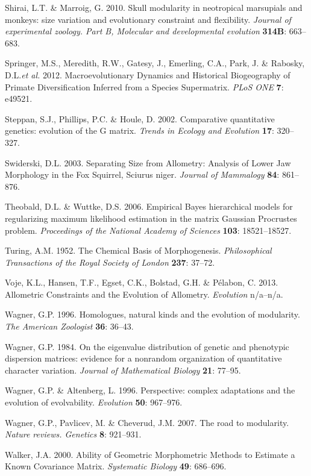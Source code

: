 \documentclass[11pt,twoside]{report}
\begin{document}
Shirai, L.T. \& Marroig, G. 2010. Skull modularity in neotropical
marsupials and monkeys: size variation and evolutionary constraint and
flexibility. \emph{Journal of experimental zoology. Part B, Molecular
and developmental evolution} \textbf{314B}: 663--683.

Springer, M.S., Meredith, R.W., Gatesy, J., Emerling, C.A., Park, J. \&
Rabosky, D.L.\emph{et al.} 2012. Macroevolutionary Dynamics and
Historical Biogeography of Primate Diversification Inferred from a
Species Supermatrix. \emph{PLoS ONE} \textbf{7}: e49521.

Steppan, S.J., Phillips, P.C. \& Houle, D. 2002. Comparative
quantitative genetics: evolution of the G matrix. \emph{Trends in
Ecology and Evolution} \textbf{17}: 320--327.

Swiderski, D.L. 2003. Separating Size from Allometry: Analysis of Lower
Jaw Morphology in the Fox Squirrel, Sciurus niger. \emph{Journal of
Mammalogy} \textbf{84}: 861--876.

Theobald, D.L. \& Wuttke, D.S. 2006. Empirical Bayes hierarchical models
for regularizing maximum likelihood estimation in the matrix Gaussian
Procrustes problem. \emph{Proceedings of the National Academy of
Sciences} \textbf{103}: 18521--18527.

Turing, A.M. 1952. The Chemical Basis of Morphogenesis.
\emph{Philosophical Transactions of the Royal Society of London}
\textbf{237}: 37--72.

Voje, K.L., Hansen, T.F., Egset, C.K., Bolstad, G.H. \& Pélabon, C.
2013. Allometric Constraints and the Evolution of Allometry.
\emph{Evolution} n/a--n/a.

Wagner, G.P. 1996. Homologues, natural kinds and the evolution of
modularity. \emph{The American Zoologist} \textbf{36}: 36--43.

Wagner, G.P. 1984. On the eigenvalue distribution of genetic and
phenotypic dispersion matrices: evidence for a nonrandom organization of
quantitative character variation. \emph{Journal of Mathematical Biology}
\textbf{21}: 77--95.

Wagner, G.P. \& Altenberg, L. 1996. Perspective: complex adaptations and
the evolution of evolvability. \emph{Evolution} \textbf{50}: 967--976.

Wagner, G.P., Pavlicev, M. \& Cheverud, J.M. 2007. The road to
modularity. \emph{Nature reviews. Genetics} \textbf{8}: 921--931.

Walker, J.A. 2000. Ability of Geometric Morphometric Methods to Estimate
a Known Covariance Matrix. \emph{Systematic Biology} \textbf{49}:
686--696.
\end{document}
